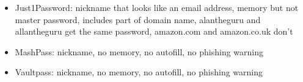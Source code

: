 \begin{itemize}

\item Just1Password: nickname that looks like an email address, memory but not master password, includes part of domain name, alantheguru and allantheguru get the same password, amazon.com and amazon.co.uk don't


\item MashPass: nickname, no memory, no autofill, no phishing warning


\item Vaultpass:  nickname, no memory, no autofill, no phishing warning

\end{itemize}



